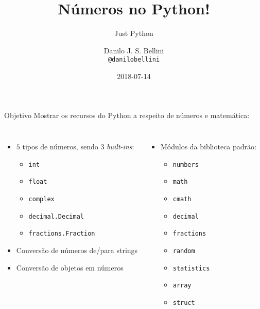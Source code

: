 \documentclass[utf8]{beamer}
\title{Números no Python!}
\subtitle{Just Python}
\author{Danilo J. S. Bellini \\ \texttt{@danilobellini}}
\date{2018-07-14}
\begin{document}
\begin{frame}
  \titlepage
\end{frame}


\begin{frame}{Objetivo}
  Mostrar os recursos do Python a respeito de números e matemática:
  \begin{columns}[t]

    \begin{itemize}
      \item
      $5$ tipos de números, sendo $3$ \emph{built-ins}:
      \begin{itemize}
        \item \texttt{int}
        \item \texttt{float}
        \item \texttt{complex}
        \item \texttt{decimal.Decimal}
        \item \texttt{fractions.Fraction}
      \end{itemize}

      \item Conversão de números de/para strings
      \item Conversão de objetos em números
    \end{itemize}

    \begin{itemize}
      \item
      Módulos da biblioteca padrão:
      \begin{itemize}
        \item \texttt{numbers}
        \item \texttt{math}
        \item \texttt{cmath}
        \item \texttt{decimal}
        \item \texttt{fractions}
        \item \texttt{random}
        \item \texttt{statistics}
        \item \texttt{array}
        \item \texttt{struct}
      \end{itemize}
    \end{itemize}

  \end{columns}
\end{frame}
\end{document}
